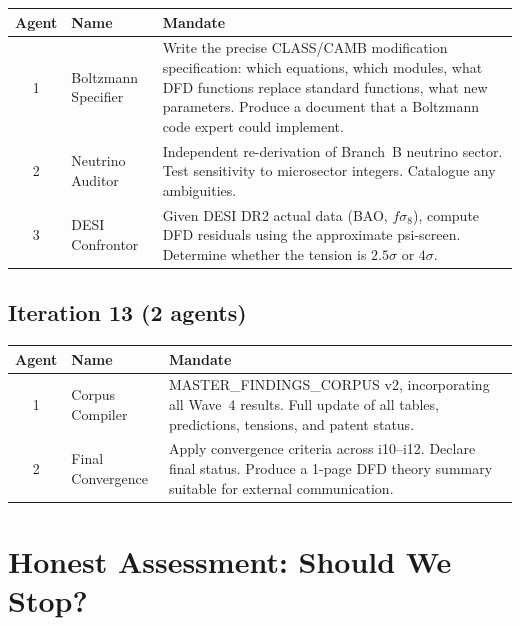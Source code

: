 \documentclass[11pt]{article}
\begin{document}
\begin{table}[H]
\centering
\begin{tabular}{clp{7.5cm}}
\toprule
\textbf{Agent} & \textbf{Name} & \textbf{Mandate} \\
\midrule
1 & Boltzmann Specifier & Write the precise CLASS/CAMB modification
  specification: which equations, which modules, what DFD functions
  replace standard functions, what new parameters. Produce a document
  that a Boltzmann code expert could implement. \\
2 & Neutrino Auditor & Independent re-derivation of Branch~B neutrino
  sector. Test sensitivity to microsector integers. Catalogue any
  ambiguities. \\
3 & DESI Confrontor & Given DESI DR2 actual data (BAO, $f\sigma_8$),
  compute DFD residuals using the approximate psi-screen. Determine
  whether the tension is $2.5\sigma$ or $4\sigma$. \\
\bottomrule
\end{tabular}
\end{table}

\subsection{Iteration 13 (2 agents)}

\begin{table}[H]
\centering
\begin{tabular}{clp{7.5cm}}
\toprule
\textbf{Agent} & \textbf{Name} & \textbf{Mandate} \\
\midrule
1 & Corpus Compiler & MASTER\_FINDINGS\_CORPUS v2, incorporating all
  Wave~4 results. Full update of all tables, predictions, tensions,
  and patent status. \\
2 & Final Convergence & Apply convergence criteria across i10--i12.
  Declare final status. Produce a 1-page DFD theory summary suitable
  for external communication. \\
\bottomrule
\end{tabular}
\end{table}


\section{Honest Assessment: Should We Stop?}
\label{sec:honest}
\end{document}
